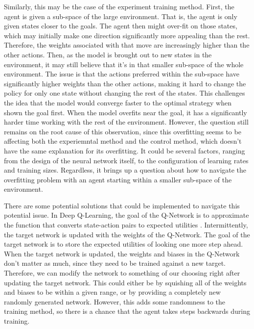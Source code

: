 \documentclass[12pt,letterpaper]{article}
\begin{document}
Similarly, this may be the case of the experiment training method.
First, the agent is given a sub-space of the large environment.
That is, the agent is only given states closer to the goals.
The agent then might over-fit on those states, which may initially make one direction significantly more appealing than the rest.
Therefore, the weights associated with that move are increasingly higher than the other actions.
Then, as the model is brought out to new states in the environment, it may still believe that it's in that smaller sub-space of the whole environment.
The issue is that the actions preferred within the sub-space have significantly higher weights than the other actions, making it hard to change the policy for only one state without changing the rest of the states.
This challenges the idea that the model would converge faster to the optimal strategy when shown the goal first.
When the model overfits near the goal, it has a significantly harder time working with the rest of the environment.
However, the question still remains on the root cause of this observation, since this overfitting seems to be affecting both the experiemntal method and the control method, which doesn't have the same explanation for its overfitting.
It could be several factors, ranging from the design of the neural network itself, to the configuration of learning rates and training sizes.
Regardless, it brings up a question about how to navigate the overfitting problem with an agent starting within a smaller sub-space of the environment.

There are some potential solutions that could be implemented to navigate this potential issue.
In Deep Q-Learning, the goal of the Q-Network is to approximate the function that converts state-action pairs to expected utilities \cite{article_reinforcement_learning_survey}.
Intermittently, the target network is updated with the weights of the Q-Network.
The goal of the target network is to store the expected utilities of looking one more step ahead.
When the target network is updated, the weights and biases in the Q-Network don't matter as much, since they need to be trained against a new target.
Therefore, we can modify the network to something of our choosing right after updating the target network.
This could either be by squishing all of the weights and biases to be within a given range, or by providing a completely new randomly generated network.
However, this adds some randomness to the training method, so there is a chance that the agent takes steps backwards during training.

\newpage


\end{document}

